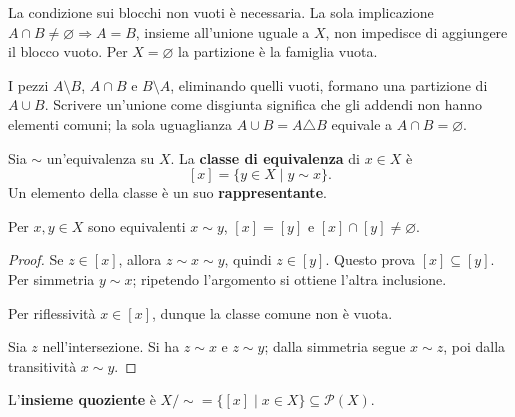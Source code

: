 \begin{osservazione}
La condizione sui blocchi non vuoti è necessaria. La sola implicazione $A\cap B\ne\varnothing\Rightarrow A=B$, insieme all'unione uguale a $X$, non impedisce di aggiungere il blocco vuoto. Per $X=\varnothing$ la partizione è la famiglia vuota.
\end{osservazione}

\begin{esempio}
I pezzi $A\setminus B$, $A\cap B$ e $B\setminus A$, eliminando quelli vuoti, formano una partizione di $A\cup B$. Scrivere un'unione come disgiunta significa che gli addendi non hanno elementi comuni; la sola uguaglianza $A\cup B=A\triangle B$ equivale a $A\cap B=\varnothing$.
\end{esempio}

\begin{definizione}
Sia $\sim$ un'equivalenza su $X$. La \textbf{classe di equivalenza} di $x\in X$ è
\[
[x]=\{y\in X\mid y\sim x\}.
\]
Un elemento della classe è un suo \textbf{rappresentante}.
\end{definizione}

\begin{proposizione}\label{prop:classi}
Per $x,y\in X$ sono equivalenti $x\sim y$, $[x]=[y]$ e $[x]\cap[y]\ne\varnothing$.
\end{proposizione}
\begin{proof}
 Se $z\in[x]$, allora $z\sim x\sim y$, quindi $z\in[y]$. Questo prova $[x]\subseteq[y]$. Per simmetria $y\sim x$; ripetendo l'argomento si ottiene l'altra inclusione.

\passomath{[x]=[y]\Rightarrow[x]\cap[y]\ne\varnothing} Per riflessività $x\in[x]$, dunque la classe comune non è vuota.

 Sia $z$ nell'intersezione. Si ha $z\sim x$ e $z\sim y$; dalla simmetria segue $x\sim z$, poi dalla transitività $x\sim y$.
\end{proof}

\begin{definizione}
L'\textbf{insieme quoziente} è $X/{\sim}=\{[x]\mid x\in X\}\subseteq\mathcal P(X)$.
\end{definizione}

